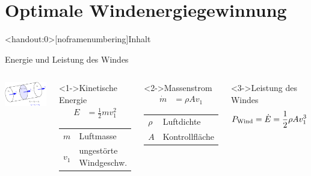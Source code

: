 \section[Windenergiegewinnung]{Optimale Windenergiegewinnung}\label{sec:WEN}
\miniframesoff	
\begin{frame}<handout:0>[noframenumbering]{Inhalt}
\tableofcontents[currentsection]
\end{frame}
\miniframeson
\begin{frame}{Energie und Leistung des Windes} 
\setlength{\abovedisplayskip}{0pt}
\setlength{\belowdisplayskip}{0pt}
\begin{columns}
	\column{9cm} 
	\includegraphics[width=\linewidth]{WEN/streamtube1.pdf}		
	\column{6cm}
	\vspace*{-1pt}
	\begin{block}<1->{Kinetische Energie}
		\begin{align*}
		E   & = \frac{1}{2} m v_1^2
		\end{align*}
		\begin{tabular}{ll}
			$m$ 	&  Luftmasse\\
			$v_1$ 	&  ungestörte Windgeschw.
		\end{tabular}
	\end{block}	
	\begin{block}<2->{Massenstrom}
		\begin{align*}
		\dot m & = \rho A v_1
		\end{align*}
		\begin{tabular}{ll}
			$\rho $ 	&  Luftdichte\\
			$A$ 		&  Kontrollfläche
		\end{tabular}	
	\end{block}	
	\begin{block}<3->{Leistung des Windes}
		\begin{align*}
		P_{\textnormal{Wind}}=\dot E = \frac{1}{2} \rho A v_1^3 
		\end{align*}
	\end{block}	
\end{columns} 	
\end{frame}
